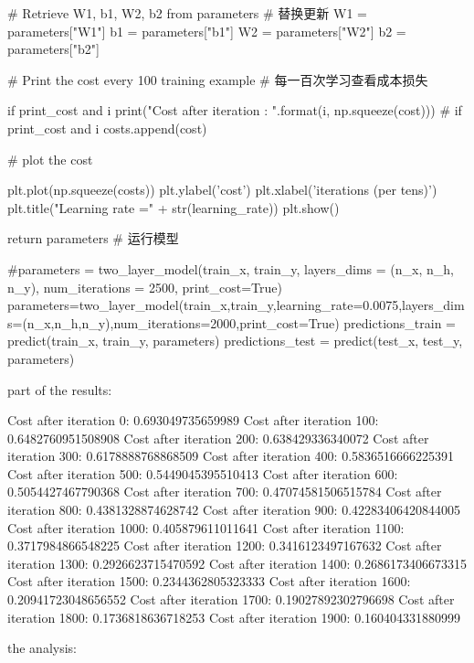 \documentclass[12pt,a4paper]{article}
\begin{document}
\begin{python}
			# Retrieve W1, b1, W2, b2 from parameters
			# 替换更新
			W1 = parameters["W1"]
			b1 = parameters["b1"]
			W2 = parameters["W2"]
			b2 = parameters["b2"]
			
			# Print the cost every 100 training example
			# 每一百次学习查看成本损失
			
			if print_cost and i %
			print("Cost after iteration {}: {}".format(i, np.squeeze(cost)))
			# if print_cost and i %
			costs.append(cost)
			
			# plot the cost
			
			plt.plot(np.squeeze(costs))
			plt.ylabel('cost')
			plt.xlabel('iterations (per tens)')
			plt.title("Learning rate =" + str(learning_rate))
			plt.show()
			
			return parameters
			# 运行模型
			
			#parameters = two_layer_model(train_x, train_y, layers_dims = (n_x, n_h, n_y), num_iterations = 2500, print_cost=True)
			parameters=two_layer_model(train_x,train_y,learning_rate=0.0075,layers_dims=(n_x,n_h,n_y),num_iterations=2000,print_cost=True)
			predictions_train = predict(train_x, train_y, parameters)
			predictions_test = predict(test_x, test_y, parameters)
		\end{python}
		part of the results:\par
		\begin{python}
			Cost after iteration 0: 0.693049735659989
			Cost after iteration 100: 0.6482760951508908
			Cost after iteration 200: 0.638429336340072
			Cost after iteration 300: 0.6178888768868509
			Cost after iteration 400: 0.5836516666225391
			Cost after iteration 500: 0.5449045395510413
			Cost after iteration 600: 0.5054427467790368
			Cost after iteration 700: 0.47074581506515784
			Cost after iteration 800: 0.4381328874628742
			Cost after iteration 900: 0.42283406420844005
			Cost after iteration 1000: 0.405879611011641
			Cost after iteration 1100: 0.3717984866548225
			Cost after iteration 1200: 0.3416123497167632
			Cost after iteration 1300: 0.2926623715470592
			Cost after iteration 1400: 0.2686173406673315
			Cost after iteration 1500: 0.2344362805323333
			Cost after iteration 1600: 0.20941723048656552
			Cost after iteration 1700: 0.19027892302796698
			Cost after iteration 1800: 0.1736818636718253
			Cost after iteration 1900: 0.160404331880999
		\end{python}
		the analysis:
\end{document}
